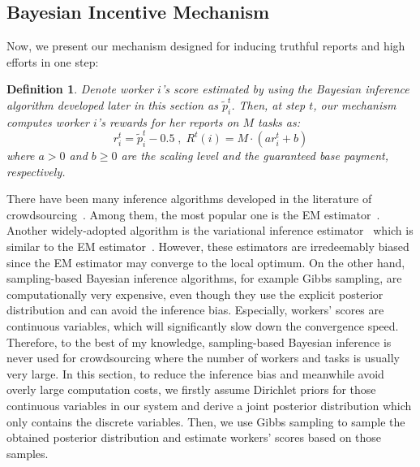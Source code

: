 \documentclass{article}
\newtheorem{definition}{Definition}
\begin{document}
\subsection{Bayesian Incentive Mechanism}
Now, we present our mechanism designed for inducing truthful reports and high efforts in one step:
\begin{definition}
\label{MechDef}
Denote worker $i$'s score estimated by using the Bayesian inference algorithm developed later in this section as $\tilde{p}^{t}_i$. Then, at step $t$, our mechanism computes worker $i$'s rewards for her reports on $M$ tasks as:
\begin{equation}
r^{t}_i = \tilde{p}^{t}_i - 0.5\; ,\; R^t(i)=M\cdot (ar^{t}_i+b)
\end{equation}
where $a>0$ and $b\geq 0$ are the scaling level and the guaranteed base payment, respectively.
\end{definition}
There have been many inference algorithms developed in the literature of crowdsourcing~\cite{zheng2017truth}. Among them, the most popular one is the EM estimator~\cite{dawid1979maximum}. Another widely-adopted algorithm is the variational inference estimator~\cite{liu2012variational} which is similar to the EM estimator~\cite{tzikas2008variational}.
However, these estimators are irredeemably biased since the EM estimator may converge to the local optimum.
On the other hand, sampling-based Bayesian inference algorithms, for example Gibbs sampling, are computationally very expensive, even though they use the explicit posterior distribution and can avoid the inference bias.
Especially, workers' scores are continuous variables, which will significantly slow down the convergence speed.
Therefore, to the best of my knowledge, sampling-based Bayesian inference is never used for crowdsourcing where the number of workers and tasks is usually very large.
In this section, to reduce the inference bias and meanwhile avoid overly large computation costs, we firstly assume Dirichlet priors for those continuous variables in our system and derive a joint posterior distribution which only contains the discrete variables.
Then, we use Gibbs sampling to sample the obtained posterior distribution and estimate workers' scores based on those samples.
\end{document}
